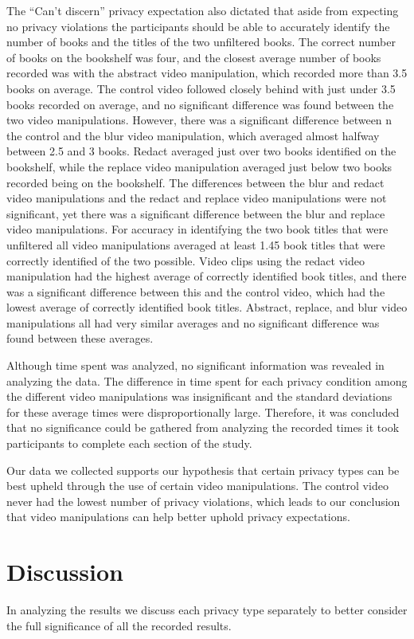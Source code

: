 \documentclass{acm_proc_article-sp}
\begin{document}
The ``Can't discern'' privacy expectation also dictated that aside from expecting no privacy violations the participants should be able to accurately identify the number of books and the titles of the two unfiltered books. The correct number of books on the bookshelf was four, and the closest average number of books recorded was with the abstract video manipulation, which recorded more than 3.5 books on average. The control video followed closely behind with just under 3.5 books recorded on average, and no significant difference was found between the two video manipulations. However, there was a significant difference between n the control and the blur video manipulation, which averaged almost halfway between 2.5 and 3 books. Redact averaged just over two books identified on the bookshelf, while the replace video manipulation averaged just below two books recorded being on the bookshelf. The differences between the blur and redact video manipulations and the redact and replace video manipulations were not significant, yet there was a significant difference between the blur and replace video manipulations.  
For accuracy in identifying the two book titles that were unfiltered all video manipulations averaged at least 1.45 book titles that were correctly identified of the two possible. Video clips using the redact video manipulation had the highest average of correctly identified book titles, and there was a significant difference between this and the control video, which had the lowest average of correctly identified book titles. Abstract, replace, and blur video manipulations all had very similar averages and no significant difference was found between these averages.

Although time spent was analyzed, no significant information was revealed in analyzing the data. The difference in time spent for each privacy condition among the different video manipulations was insignificant and the standard deviations for these average times were disproportionally large. Therefore, it was concluded that no significance could be gathered from analyzing the recorded times it took participants to complete each section of the study. 

Our data we collected supports our hypothesis that certain privacy types can be best upheld through the use of certain video manipulations. The control video never had the lowest number of privacy violations, which leads to our conclusion that video manipulations can help better uphold privacy expectations. 

\section{Discussion}
In analyzing the results we discuss each privacy type separately to better consider the full significance of all the recorded results. 
\end{document}

